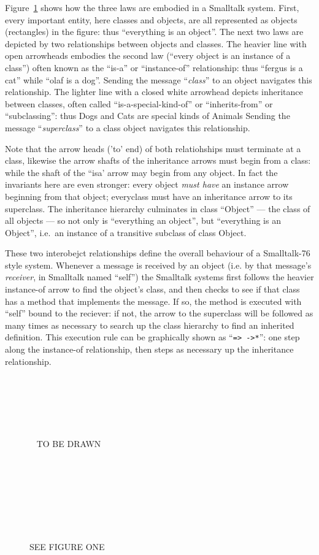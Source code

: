 Figure~\ref{see-figure-one} shows how the three laws are embodied in a
Smalltalk system. First, every important entity, here classes and
objects, are all represented as objects (rectangles) in the figure:
thus ``everything is an object''.  The next two laws are depicted by
two relationships between objects and classes. The heavier line with
open arrowheads embodies the second law (``every object is an instance
of a class'') often known as the ``is-a'' or ``instance-of''
relationship: thus ``fergus is a cat'' while ``olaf is a dog''.
Sending the message ``\textsl{class}'' to an object navigates this
relationship.  The lighter line with a closed white arrowhead depicts
inheritance between classes, often called ``is-a-special-kind-of'' or
``inherits-from'' or ``subclassing'': thus Dogs and Cats are special
kinds of Animals Sending the message ``\textsl{superclass}'' to a
class object navigates this relationship.

Note that the arrow heads ('to' end) of both relatiohships must
terminate at a class, likewise the arrow shafts of the inheritance
arrows must begin from a class: while the shaft of the ``isa' arrow
may begin from any object.  In fact the invariants here are even
stronger: every object \textit{must have} an instance arrow beginning
from that object; every\footnotemark[1] class must have an inheritance
arrow to its superclass. The inheritance hierarchy culminates in class
``\textsf{Object}'' --- the class of all objects --- so not only is
``everything an object'', but ``everything is an \textsf{Object}'',
i.e.\ an instance of a transitive subclass of class \textsf{Object}.

These two interobejct relationships define the overall behaviour of a
Smalltalk-76 style system. Whenever a message is received by an object
(i.e. by that message's \textit{receiver}, in Smalltalk named
``\textsf{self}'') the Smalltalk systems first follows the heavier
instance-of arrow to find the object's class, and then checks to see
if that class has a method that implements the message.  If so, the
method is executed with ``\textsf{self}'' bound to the reciever: if
not, the arrow to the superclass will be followed as many times as
necessary to search up the class hierarchy to find an inherited
definition. This execution rule can be graphically shown as
``\verb+=> ->*+'': one step along the instance-of relationship, then
steps as necessary up the inheritance relationship.

\begin{figure}[htb]
\begin{center}
 
~

  ~

  ~

  ~   TO BE DRAWN

  ~

  ~

  ~

  ~
  
\end{center}
\caption{SEE FIGURE ONE}
\label{see-figure-one}
\end{figure}


